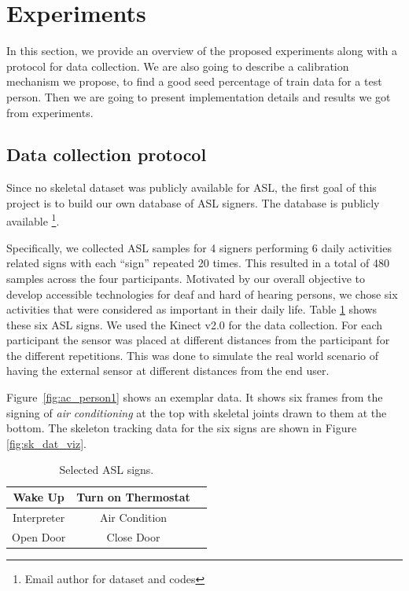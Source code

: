 \documentclass[10pt,twocolumn,letterpaper]{article}
\begin{document}
\section{Experiments}
In this section, we provide an overview of the proposed experiments along with a protocol for data collection. 
We are also going to describe a calibration mechanism we propose, to find a good seed
percentage of train data for a test person. Then we are going to present implementation details and results we got from experiments. 

\subsection{Data collection protocol}

Since no skeletal dataset was publicly available for
ASL, the first goal of this project is to build our own 
database of ASL signers. The database is publicly available \footnote{Email author for dataset and codes}.



Specifically, we collected  ASL samples 
for 4 signers performing 
  6 daily activities related signs with each ``sign'' repeated 20 times. This resulted in a total of 480 samples 
  across the four participants. Motivated by our overall objective to develop
  accessible technologies for deaf and hard of hearing persons, we chose 
  six activities that were considered as important in their daily life. Table \ref{table:asl_signs} 
  shows these six ASL signs. We used the Kinect v2.0 for the data collection. For each participant 
the sensor was placed at different distances from the participant for the 
different repetitions. This was done to simulate the real world scenario of having the external sensor 
at different distances from the end user. 

Figure~\ref{fig:ac_person1} shows an exemplar data. It shows six frames from the signing of 
\textit{air conditioning} at the top with 
skeletal joints drawn  to them at the bottom.  The skeleton tracking data for the six signs 
are shown in Figure \ref{fig:sk_dat_viz}.


\begin{table}[h]
	\begin{center}
		\begin{tabular}{|c|c|c}
			\hline
			Wake Up & Turn on Thermostat\\
			\hline
			Interpreter & Air Condition\\
			\hline
			Open Door & Close Door\\
			\hline
		\end{tabular}
	\end{center}
	\caption{Selected ASL signs.}
	\label{table:asl_signs}
\end{table}
\end{document}
